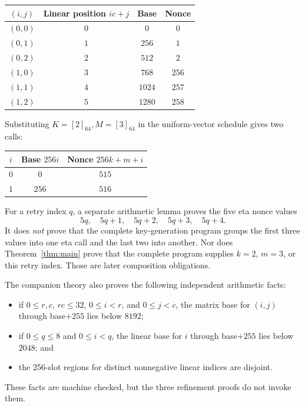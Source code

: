 \documentclass[11pt]{article}
\theoremstyle{definition}
\theoremstyle{plain}
\theoremstyle{remark}
\newcommand{\enc}[1]{\left[#1\right]_{64}}
\begin{document}
\begin{center}
\begin{tabular}{cccc}
\toprule
$(i,j)$ & Linear position $ic+j$ & Base & Nonce \\
\midrule
$(0,0)$ & $0$ & $0$ & $0$ \\
$(0,1)$ & $1$ & $256$ & $1$ \\
$(0,2)$ & $2$ & $512$ & $2$ \\
$(1,0)$ & $3$ & $768$ & $256$ \\
$(1,1)$ & $4$ & $1024$ & $257$ \\
$(1,2)$ & $5$ & $1280$ & $258$ \\
\bottomrule
\end{tabular}
\end{center}

Substituting $K=\enc{2},M=\enc{3}$ in the uniform-vector schedule gives two
calls:
\begin{center}
\begin{tabular}{ccc}
\toprule
$i$ & Base $256i$ & Nonce $256k+m+i$ \\
\midrule
$0$ & $0$ & $515$ \\
$1$ & $256$ & $516$ \\
\bottomrule
\end{tabular}
\end{center}

For a retry index $q$, a separate arithmetic lemma proves the five eta nonce
values
\[
  5q,\quad 5q+1,\quad 5q+2,\quad 5q+3,\quad 5q+4.
\]
It does \emph{not} prove that the complete key-generation program groups the
first three values into one eta call and the last two into another.  Nor does
Theorem~\ref{thm:main} prove that the complete program supplies $k=2$, $m=3$,
or this retry index.  Those are later composition obligations.

The companion theory also proves the following independent arithmetic facts:
\begin{itemize}
\item if $0\le r,c$, $rc\le32$, $0\le i<r$, and $0\le j<c$, the matrix base
for $(i,j)$ through base$+255$ lies below $8192$;
\item if $0\le q\le8$ and $0\le i<q$, the linear base for $i$ through
base$+255$ lies below $2048$; and
\item the 256-slot regions for distinct nonnegative linear indices are
disjoint.
\end{itemize}
These facts are machine checked, but the three refinement proofs do not invoke
them.
\end{document}
